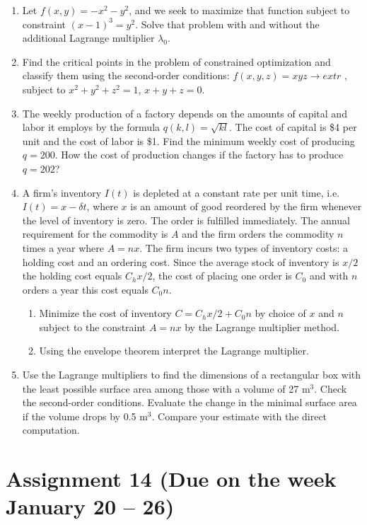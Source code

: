 \documentclass[12pt]{article} %
\theoremstyle{definition} %
\begin{document}
\begin{enumerate}
\item Let $f(x,y)=-x^2-y^2$, and we seek to maximize that function subject to constraint $(x-1)^3=y^2$. Solve that problem with and without the additional Lagrange multiplier $\lambda_0$.

\item Find the critical points in the problem of constrained optimization and classify them using the second-order conditions: $f(x,y,z)=xyz\rightarrow extr$ , subject to $x^2+y^2+z^2=1$, $x+y+z=0$.

\item The weekly production of a factory depends on the amounts of capital and labor it employs by the formula $q(k,l)=\sqrt{kl}$. The cost of capital is \$4 per unit and the cost of labor is \$1. Find the minimum weekly cost of producing $q=200$. How the cost of production changes if the factory has to produce $q=202$?

\item A firm's inventory $I(t)$ is depleted at a constant rate per unit time, i.e. $I(t)=x-\delta t$, where $x$ is an amount of good reordered by the firm whenever the level of inventory is zero. The order is fulfilled immediately. The annual requirement for the commodity is $A$ and the firm orders the commodity $n$ times a year where $A=nx$. The firm incurs two types of inventory costs: a holding cost and an ordering cost. Since the average stock of inventory is $x/2$ the holding cost equals $C_hx/2$, the cost of placing one order is $C_0$ and with $n$ orders a year this cost equals $C_0n$.
\begin{enumerate} 
\item Minimize the cost of inventory $C=C_hx/2+C_0n$ by choice of $x$ and $n$ subject to the constraint $A=nx$ by the Lagrange multiplier method.
\item Using the envelope theorem interpret the Lagrange multiplier.
\end{enumerate}
\item Use the Lagrange multipliers to find the dimensions of a rectangular box with the least possible surface area among those with a volume of 27 m$^3$. Check the second-order conditions. Evaluate the change in the minimal surface area if the volume drops by 0.5 m$^3$. Compare your estimate with the direct computation.
\end{enumerate}



\section{Assignment 14 (Due on the week January 20 – 26)}
\end{document}
